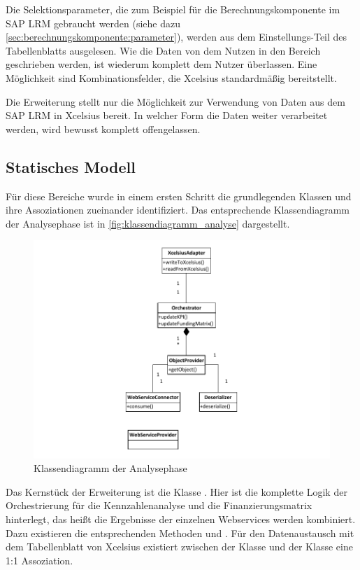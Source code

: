 \begin{onehalfspacing}
Die Selektionsparameter, die zum Beispiel für die Berechnungskomponente im SAP LRM gebraucht werden (siehe dazu \vref{sec:berechnungskomponente:parameter}), werden aus dem Ein\-stel\-lungs-Teil des Tabellenblatts ausgelesen. Wie die Daten von dem Nutzen in den Bereich geschrieben werden, ist wiederum komplett dem Nutzer überlassen. Eine Möglichkeit sind Kombinationsfelder, die \gls{Xcelsius} standardmäßig bereitstellt.

Die Erweiterung stellt nur die Möglichkeit zur Verwendung von Daten aus dem SAP LRM in \gls{Xcelsius} bereit. In welcher Form die Daten weiter verarbeitet werden, wird bewusst komplett offengelassen.

\subsection{Statisches Modell}
Für diese Bereiche wurde in einem ersten Schritt die grundlegenden Klassen und ihre Assoziationen zueinander identifiziert. Das entsprechende Klassendiagramm der Analysephase ist in \vref{fig:klassendiagramm_analyse} dargestellt.

\begin{figure}[ht]
\centering
\setlength{\unitlength}{1mm}
\includegraphics[width=15cm]{Visio/Analyse.pdf}
\caption{Klassendiagramm der Analysephase \label{fig:klassendiagramm_analyse}}
\end{figure}

Das Kernstück der Erweiterung ist die Klasse . Hier ist die komplette Logik der Orchestrierung für die Kennzahlenanalyse und die Finanzierungsmatrix hinterlegt, das heißt die Ergebnisse der einzelnen Webservices werden kombiniert. Dazu existieren die entsprechenden Methoden  und . Für den Datenaustausch mit dem Tabellenblatt von \gls{Xcelsius} existiert zwischen der Klasse  und der Klasse  eine 1:1 Assoziation.


\end{onehalfspacing}
